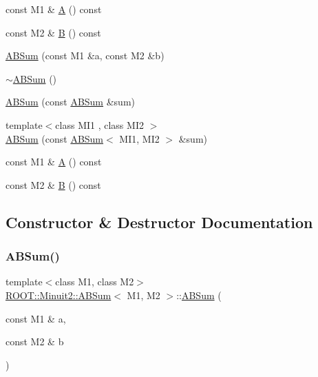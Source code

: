 \begin{DoxyCompactItemize}
\item 
const M1 \& \mbox{\hyperlink{classROOT_1_1Minuit2_1_1ABSum_a079b47b55709bd81d820c277aa389b4f}{A}} () const
\item 
const M2 \& \mbox{\hyperlink{classROOT_1_1Minuit2_1_1ABSum_a6370bd6e7593778d1933ef761dad2449}{B}} () const
\item 
\mbox{\hyperlink{classROOT_1_1Minuit2_1_1ABSum_adaac8ec05b73e9e86e736faab9a685fe}{A\+B\+Sum}} (const M1 \&a, const M2 \&b)
\item 
\mbox{\hyperlink{classROOT_1_1Minuit2_1_1ABSum_ab2d4441bcbcb38be86091d5eda7b63b2}{$\sim$\+A\+B\+Sum}} ()
\item 
\mbox{\hyperlink{classROOT_1_1Minuit2_1_1ABSum_ae687b46f660f6db5ca9c4626fd5e5a4b}{A\+B\+Sum}} (const \mbox{\hyperlink{classROOT_1_1Minuit2_1_1ABSum}{A\+B\+Sum}} \&sum)
\item 
{\footnotesize template$<$class M\+I1 , class M\+I2 $>$ }\\\mbox{\hyperlink{classROOT_1_1Minuit2_1_1ABSum_a4f9776ad68bfb91ccf613b367ecf6730}{A\+B\+Sum}} (const \mbox{\hyperlink{classROOT_1_1Minuit2_1_1ABSum}{A\+B\+Sum}}$<$ M\+I1, M\+I2 $>$ \&sum)
\item 
const M1 \& \mbox{\hyperlink{classROOT_1_1Minuit2_1_1ABSum_a079b47b55709bd81d820c277aa389b4f}{A}} () const
\item 
const M2 \& \mbox{\hyperlink{classROOT_1_1Minuit2_1_1ABSum_a6370bd6e7593778d1933ef761dad2449}{B}} () const
\end{DoxyCompactItemize}


\subsection{Constructor \& Destructor Documentation}
\mbox{\label{classROOT_1_1Minuit2_1_1ABSum_adaac8ec05b73e9e86e736faab9a685fe}} 
\subsubsection{\texorpdfstring{ABSum()}{ABSum()}\hspace{0.1cm}{\footnotesize\ttfamily [1/9]}}
{\footnotesize\ttfamily template$<$class M1, class M2$>$ \\
\mbox{\hyperlink{classROOT_1_1Minuit2_1_1ABSum}{R\+O\+O\+T\+::\+Minuit2\+::\+A\+B\+Sum}}$<$ M1, M2 $>$\+::\mbox{\hyperlink{classROOT_1_1Minuit2_1_1ABSum}{A\+B\+Sum}} (\begin{DoxyParamCaption}\item[{const M1 \&}]{a,  }\item[{const M2 \&}]{b }\end{DoxyParamCaption})\hspace{0.3cm}{\ttfamily [inline]}}

